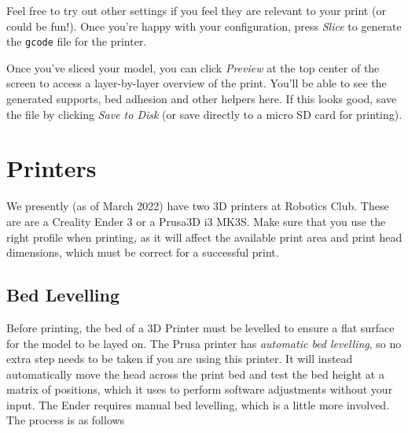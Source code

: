 \documentclass[12pt]{report}
\begin{document}
Feel free to try out other settings if you feel they are relevant to your print
(or could be fun!). Once you're happy with your configuration, press
\textit{Slice} to generate the \texttt{gcode} file for the printer. \par
Once you've sliced your model, you can click \textit{Preview} at the top center
of the screen to access a layer-by-layer overview of the print. You'll be able
to see the generated supports, bed adhesion and other helpers here. If this
looks good, save the file by clicking \textit{Save to Disk} (or save directly
to a micro SD card for printing).

\section*{Printers}
\label{sec:printers}

We presently (as of March 2022) have two 3D printers at Robotics Club. These are
are a Creality Ender 3 or a Prusa3D i3 MK3S. Make sure that you use the right
profile when printing, as it will affect the available print area and print head
dimensions, which must be correct for a successful print.

\subsection*{Bed Levelling}
\label{sec:levelling}

Before printing, the bed of a 3D Printer must be levelled to ensure a flat
surface for the model to be layed on. The Prusa printer has \textit{automatic
bed levelling}, so no extra step needs to be taken if you are using this
printer. It will instead automatically move the head across the print bed and
test the bed height at a matrix of positions, which it uses to perform software
adjustments without your input. The Ender requires manual bed levelling, which
is a little more involved. The process is as follows
\end{document}
